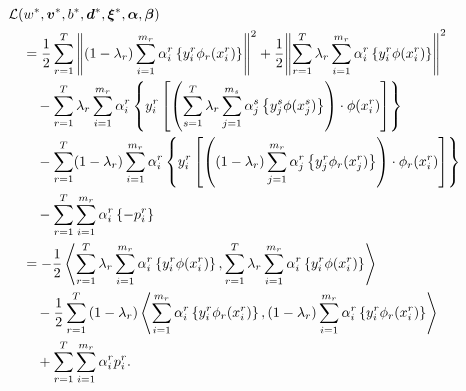\begin{equation}\nonumber
    \begin{aligned}
        & \mathcal{L}({{w}}^*, {\bm{v}}^*, {b}^*, {\bm{d}}^*, {\bm{\xi}}^*, \bm{\alpha}, \bm{\beta})\\
        &\quad=  \frac{1}{2} \sum_{r= 1}^T{\left\lVert (1 - \lambda_r) \sum_{i=1}^{m_r}  {\alpha_i^r} \left\lbrace y_i^r \phi_r({x}_i^r) \right\rbrace\right\rVert^2} + \frac{1}{2} {\left\lVert\sum_{r= 1}^T \lambda_r \sum_{i=1}^{m_r} {\alpha_i^r} \left\lbrace y_i^r \phi({x}_i^r) \right\rbrace\right\rVert}^2 \\
        &\qquad - \sum_{r= 1}^T \lambda_r \sum_{i=1}^{m_r} \alpha_i^r \left\lbrace y_{i}^r \left[ \left(\sum_{s= 1}^T \lambda_r \sum_{j=1}^{m_s} {\alpha_j^s} \left\lbrace y_j^s \phi({x}_j^s) \right\rbrace \right) \cdot \phi({x}_{i}^r) \right]  \right\rbrace \\
        &\qquad -  \sum_{r= 1}^T (1-\lambda_r) \sum_{i=1}^{m_r} \alpha_i^r \left\lbrace y_{i}^r \left[  \left((1-\lambda_r) \sum_{j=1}^{m_r} {\alpha_j^r} \left\lbrace y_j^r \phi_r({x}_j^r) \right\rbrace \right) \cdot \phi_r({x}_{i}^r)  \right]  \right\rbrace \\
        &\qquad -  \sum_{r= 1}^T \sum_{i=1}^{m_r} \alpha_i^r \left\lbrace - p_{i}^r  \right\rbrace \\
        &\quad= - \frac{1}{2} \bm{\left\langle}  \sum_{r= 1}^T  \lambda_r \sum_{i=1}^{m_r} {\alpha_i^r} \left\lbrace y_i^r \phi({x}_i^r) \right\rbrace,  \sum_{r= 1}^T \lambda_r \sum_{i=1}^{m_r} {\alpha_i^r} \left\lbrace y_i^r \phi({x}_i^r) \right\rbrace \bm{\right\rangle} \\
        &\qquad - \frac{1}{2} \sum_{r= 1}^T {(1-\lambda_r) \bm{\left\langle} \sum_{i=1}^{m_r} {\alpha_i^r} \left\lbrace y_i^r \phi_r({x}_i^r) \right\rbrace, (1-\lambda_r) \sum_{i=1}^{m_r} {\alpha_i^r} \left\lbrace y_i^r \phi_r({x}_i^r) \right\rbrace \bm{\right\rangle}} \\
        &\qquad +  \sum_{r= 1}^T \sum_{i=1}^{m_r} \alpha_i^r  p_{i}^r .
    \end{aligned}
\end{equation}
